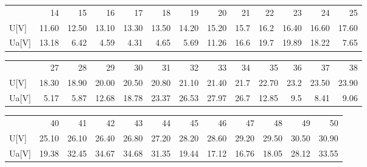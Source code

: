 \documentclass[a4paper,10pt]{article}
\begin{document}
\begin{figure}[H]
\begin{tabular}{l rrrrrrrrrrrr}
{} &     14 &     15 &     16 &     17 &     18 &     19 &     20 &    21 &    22 &     23 &     24 &     25 \\
U[V]  &  11.60 &  12.50 &  13.10 &  13.30 &  13.50 &  14.20 &  15.20 &  15.7 &  16.2 &  16.40 &  16.60 &  17.60 \\
Ua[V] &  13.18 &   6.42 &   4.59 &   4.31 &   4.65 &   5.69 &  11.26 &  16.6 &  19.7 &  19.89 &  18.22 &   7.65 \\
\end{tabular}
\end{figure}

\begin{figure}[H]
\begin{tabular}{l rrrrrrrrrrrr}
{} &     27 &     28 &     29 &     30 &     31 &     32 &     33 &    34 &     35 &    36 &     37 &     38 \\
U[V]  &  18.30 &  18.90 &  20.00 &  20.50 &  20.80 &  21.10 &  21.40 &  21.7 &  22.70 &  23.2 &  23.50 &  23.90 \\
Ua[V] &   5.17 &   5.87 &  12.68 &  18.78 &  23.37 &  26.53 &  27.97 &  26.7 &  12.85 &   9.5 &   8.41 &   9.06 \\
\end{tabular}
\end{figure}

\begin{figure}[H]
\begin{tabular}{l rrrrrrrrrrr}
{} &     40 &     41 &     42 &     43 &     44 &     45 &     46 &     47 &     48 &     49 &     50 \\
U[V]  &  25.10 &  26.10 &  26.40 &  26.80 &  27.20 &  28.20 &  28.60 &  29.20 &  29.50 &  30.50 &  30.90 \\
Ua[V] &  19.38 &  32.45 &  34.67 &  34.68 &  31.35 &  19.44 &  17.12 &  16.76 &  18.05 &  28.12 &  33.55 \\
\end{tabular}
\end{figure}
\end{document}
